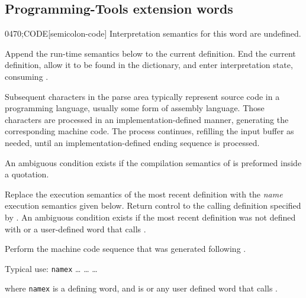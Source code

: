 \subsection{Programming-Tools extension words} %
\extended\vspace{1ex}

\begin{worddef}{0470}{;CODE}[semicolon-code]
\interpret
	Interpretation semantics for this word are undefined.

\compile

	Append the run-time semantics below to the current definition.
	End the current definition, allow it to be found in the
	dictionary, and enter interpretation state, consuming
	.

	Subsequent characters in the parse area typically represent
	source code in a programming language, usually some form of
	assembly language. Those characters are processed in an
	implementation-defined manner, generating the corresponding
	machine code. The process continues, refilling the input buffer
	as needed, until an implementation-defined ending sequence is
	processed.

	An ambiguous condition exists if the compilation semantics of
	 is preformed inside a quotation.

\runtime
	\stack{}{}

	Replace the execution semantics of the most recent definition
	with the \emph{name} execution semantics given below. Return
	control to the calling definition specified by .
	An ambiguous condition exists if the most recent definition was
	not defined with  or a user-defined word that
	calls .

\execute[name]

	Perform the machine code sequence that was generated following
	.


	\begin{rationale} %
		Typical use:
		\word[core]{:} \texttt{namex}
			{\ldots}  {\ldots}
		 {\ldots}

		where \texttt{namex} is a defining word, and  is
		 or any user defined word that calls
		.
	\end{rationale}
\end{worddef}

